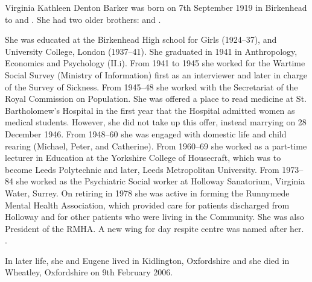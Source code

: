
Virginia Kathleen Denton Barker was born on 7th September 1919 \cite{VKDBarkerManuscript} in Birkenhead to  and .
She had two older brothers:   and .

She was educated at the Birkenhead High school for Girls (1924--37), and University College, London (1937--41). She graduated in 1941 in Anthropology, Economics and Psychology (II.i). From 1941 to 1945 she worked for the Wartime Social Survey (Ministry of Information) first as an interviewer and later in charge of the Survey of Sickness. From 1945--48 she worked with the Secretariat of the Royal Commission on Population. She was offered a place to read medicine at St. Bartholomew's Hospital in the first year that the Hospital admitted women as medical students. However, she did not take up this offer, instead marrying  on 28 December 1946\cite{VKDBarkerManuscript}. From 1948--60 she was engaged with domestic life and child rearing (Michael, Peter, and Catherine). From 1960--69 she worked as a part-time lecturer in Education at the Yorkshire College of Housecraft, which was to become Leeds Polytechnic and later, Leeds Metropolitan University. From 1973--84 she worked as the Psychiatric Social worker at Holloway Sanatorium, Virginia Water, Surrey. On retiring in 1978 she was active in forming the Runnymede Mental Health Association, which provided care for patients discharged from Holloway and for other patients who were living in the Community. She was also President of the RMHA. A new wing for day respite centre was named after her. \cite{VirginiaDocs}.

In later life, she and Eugene lived in Kidlington, Oxfordshire and she died in Wheatley, Oxfordshire  on 9th February 2006.
